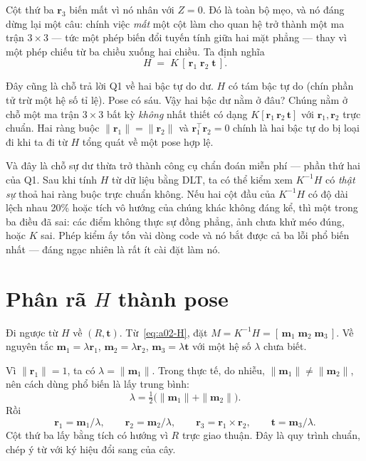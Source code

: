\documentclass[../../marker.tex]{subfiles}
\begin{document}
Cột thứ ba \(\mathbf{r}_3\) biến mất vì nó nhân với \(Z = 0\). Đó là toàn bộ mẹo, và nó đáng dừng lại một câu: chính việc \emph{mất} một cột làm cho quan hệ trở thành một ma trận \(3\times3\) --- tức một phép biến đổi tuyến tính giữa hai mặt phẳng --- thay vì một phép chiếu từ ba chiều xuống hai chiều. Ta định nghĩa
\begin{equation}
H \;=\; K\,[\,\mathbf{r}_1 \; \mathbf{r}_2 \; \mathbf{t}\,].
\label{eq:a02-H}
\end{equation}

Đây cũng là chỗ trả lời Q1 về hai bậc tự do dư. \(H\) có tám bậc tự do (chín phần tử trừ một hệ số tỉ lệ). Pose có sáu. Vậy hai bậc dư nằm ở đâu? Chúng nằm ở chỗ một ma trận \(3\times3\) bất kỳ \emph{không} nhất thiết có dạng \(K[\mathbf{r}_1\,\mathbf{r}_2\,\mathbf{t}]\) với \(\mathbf{r}_1, \mathbf{r}_2\) trực chuẩn. Hai ràng buộc \(\|\mathbf{r}_1\| = \|\mathbf{r}_2\|\) và \(\mathbf{r}_1^\top\mathbf{r}_2 = 0\) chính là hai bậc tự do bị loại đi khi ta đi từ \(H\) tổng quát về một pose hợp lệ.

Và đây là chỗ sự dư thừa trở thành công cụ chẩn đoán miễn phí --- phần thứ hai của Q1. Sau khi tính \(H\) từ dữ liệu bằng DLT, ta có thể kiểm xem \(K^{-1}H\) có \emph{thật sự} thoả hai ràng buộc trực chuẩn không. Nếu hai cột đầu của \(K^{-1}H\) có độ dài lệch nhau 20\% hoặc tích vô hướng của chúng khác không đáng kể, thì một trong ba điều đã sai: các điểm không thực sự đồng phẳng, ảnh chưa khử méo đúng, hoặc \(K\) sai. Phép kiểm ấy tốn vài dòng code và nó bắt được cả ba lỗi phổ biến nhất --- đáng ngạc nhiên là rất ít cài đặt làm nó.

\section{Phân rã \texorpdfstring{\(H\)}{H} thành pose}

Đi ngược từ \(H\) về \((R, \mathbf{t})\). Từ~\eqref{eq:a02-H}, đặt \(M = K^{-1}H = [\,\mathbf{m}_1\;\mathbf{m}_2\;\mathbf{m}_3\,]\). Về nguyên tắc \(\mathbf{m}_1 = \lambda\mathbf{r}_1\), \(\mathbf{m}_2 = \lambda\mathbf{r}_2\), \(\mathbf{m}_3 = \lambda\mathbf{t}\) với một hệ số \(\lambda\) chưa biết.

Vì \(\|\mathbf{r}_1\| = 1\), ta có \(\lambda = \|\mathbf{m}_1\|\). Trong thực tế, do nhiễu, \(\|\mathbf{m}_1\| \neq \|\mathbf{m}_2\|\), nên cách dùng phổ biến là lấy trung bình:
\[
\lambda = \tfrac{1}{2}\big(\|\mathbf{m}_1\| + \|\mathbf{m}_2\|\big).
\]
Rồi
\[
\mathbf{r}_1 = \mathbf{m}_1/\lambda, \qquad
\mathbf{r}_2 = \mathbf{m}_2/\lambda, \qquad
\mathbf{r}_3 = \mathbf{r}_1 \times \mathbf{r}_2, \qquad
\mathbf{t} = \mathbf{m}_3/\lambda .
\]
Cột thứ ba lấy bằng tích có hướng vì \(R\) trực giao thuận. Đây là quy trình chuẩn, chép ý từ \cite[§3.1]{zhang2000flexible} với ký hiệu đổi sang của cây.
\end{document}
